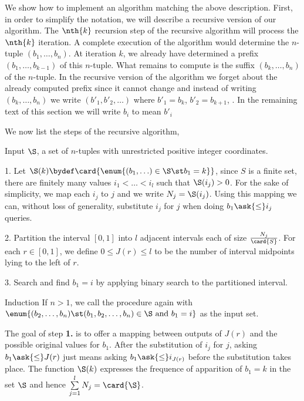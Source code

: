 We show how to implement an algorithm matching the above description. First, in
order to simplify the notation, we will describe a recursive version of our
algorithm. The $\nth{k}$ recursion step of the recursive algorithm will process
the $\nth{k}$ iteration. A complete execution of the algorithm would determine
the $n$-tuple $(b_1, \ldots, b_n)$.  At iteration $k$, we already have
determined a prefix $(b_1, \ldots, b_{k-1})$ of this $n$-tuple. What remains to
compute is the suffix $(b_k, \ldots, b_n)$ of the $n$-tuple. In the recursive
version of the algorithm we forget about the already computed prefix since it
cannot change and instead of writing $(b_k, \ldots, b_n)$ we write $(b'_1,
b'_2, \ldots)$ where $b'_1 = b_k$, $b'_2 = b_{k+1}$, \etc. In the remaining
text of this section we will write $b_i$ to mean $b'_i$

We now list the steps of the recursive algorithm,

\begin{algorithm}

\item[Input] $\S$, a set of $n$-tuples with unrestricted positive integer
coordinates.

\item[1.] Let $\S(k) \bydef \card{\enum{(b_1, \ldots) \in \S \st b_1 = k}}$,
since $S$ is a finite set, there are finitely many values $i_1 < \ldots < i_l$
such that $\S(i_j) > 0$. For the sake of simplicity, we map each $i_j$ to $j$
and we write $N_j = \S(i_j)$. Using this mapping we can, without loss of
generality, substitute $i_j$ for $j$ when doing $b_1 \ask{\le} i_j$
queries.

\item[2.] Partition the interval $[0,1]$ into $l$ adjacent intervals each of
size $\frac{N_j}{\card{S}}$. For each $r \in [0,1]$, we define $0 \le J(r) \le
l$ to be the number of interval midpoints lying to the left of $r$.

\item[3.] Search and find $b_1 = i$ by applying binary search to the partitioned
interval.

\item[Induction] If $n > 1$, we call the procedure again with\\
$\enum{(b_2, \ldots, b_n) \st (b_1, b_2, \ldots, b_n) \in \S \text{ and } b_1 =
i}$ as the input set.

\end{algorithm}

The goal of step \textbf{1.} is to offer a mapping between outputs of $J(r)$
and the possible original values for $b_1$. After the substitution of $i_j$
for $j$, asking $b_1 \ask{\le} J(r)$ just means asking $b_1 \ask{\le}
i_{J(r)}$ before the substitution takes place. The function $\S(k)$ expresses
the frequence of apparition of $b_1 = k$ in the set $\S$ and hence
$\sum\limits_{j=1}^{l} N_j = \card{\S}$.

